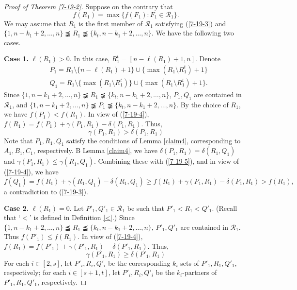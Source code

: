 \documentclass[a4paper,11pt]{article}
\begin{document}
\begin{proof}[Proof of Theorem \ref{7-19-2}]
Suppose on the contrary that
\begin{equation}\label{7-19-3}
f(R_1)=\max \{f(F_1): F_1\in \mathcal{R}_1\}.
\end{equation}
We may assume that $R_1$ is the first member of $\mathcal{R}_1$ satisfying (\ref{7-19-3}) and $\{1, n-k_1+2, \dots, n\}\precneqq   R_1\precneqq \{k_t, n-k_1+2, \dots, n\}$. We have the following two cases.

{\bf Case 1.} $\ell(R_1)>0$. In this case, $R_1^t=[n-\ell(R_1)+1, n]$.
Denote
\begin{align*}
&P_1=R_1\setminus \{n-\ell(R_1)+1\}\cup \{\max (R_1\setminus R_1^t) +1\}\\
&Q_1=R_1\setminus \{\max (R_1\setminus R_1^t)\}\cup \{\max (R_1\setminus R_1^t) +1\}.
\end{align*}
Since $\{1, n-k_1+2, \dots, n\}\precneqq R_1\precneqq \{k_t, n-k_1+2, \dots, n\}$, $P_1, Q_1$ are contained in $\mathcal{R}_1$, and $\{1, n-k_1+2, \dots, n\}\precneqq P_1 \precneqq \{k_t, n-k_1+2, \dots, n\}$. By the choice of $R_1$, we have
$
f(P_1)<f(R_1).
$
In view of (\ref{7-19-4}), $f(R_1)=f(P_1)+\gamma(P_1, R_1)-\delta(P_1, R_1)$. Thus,
\begin{equation}\label{7-19-5}
\gamma(P_1, R_1)>\delta(P_1, R_1)
\end{equation}
Note that $P_1, R_1, Q_1$ satisfy the conditions of Lemma \ref{claim4},  corresponding to $A_1, B_1, C_1$, respectively.
B Lemma \ref{claim4}, we have
$\delta(P_1, R_1)=\delta(R_1, Q_1)$ and $\gamma(P_1, R_1)\leq \gamma(R_1, Q_1)$. Combining these with (\ref{7-19-5}), and in view of (\ref{7-19-4}), we have
\[
f(Q_1)=f(R_1)+\gamma(R_1, Q_1)-\delta(R_1, Q_1)\geq f(R_1)+\gamma(P_1, R_1)-\delta(P_1, R_1)>f(R_1),
\]
a contradiction to (\ref{7-19-3}).

{\bf Case 2.} $\ell(R_1)=0$. Let $P'_1, Q'_1\in \mathcal{R}_1$ be such that $P'_1<R_1<Q'_1$. (Recall that `$<$' is defined in Definition \ref{<}.) Since $\{1, n-k_1+2, \dots, n\}\precneqq R_1\precneqq \{k_t, n-k_1+2, \dots, n\}$, $P'_1, Q'_1$ are contained in $\mathcal{R}_1$. Thus $f(P'_1)\leq f(R_1)$. In view of (\ref{7-19-4}), $f(R_1)=f(P'_1)+\gamma(P'_1, R_1)-\delta(P'_1, R_1)$. Thus,
\begin{equation}\label{7-19-7}
\gamma(P'_1, R_1)\geq \delta(P'_1, R_1)
\end{equation}
For each $i\in [2, s]$, let $P'_i, R_i, Q'_i$ be the corresponding $k_i$-sets of $P'_1, R_1, Q'_1$, respectively;
for each $i\in [s+1, t]$, let $P'_i, R_i, Q'_i$ be the $k_i$-partners of $P'_1, R_1, Q'_1$, respectively.



\end{proof}
\end{document}
